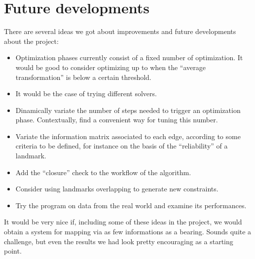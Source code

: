 \section{Future developments}
There are several ideas we got about improvements and future developments about the project:
\begin{itemize}
  \item Optimization phases currently consist of a fixed number of optimization. It would be good to consider optimizing up to when the ``average transformation'' is below a certain threshold.
  \item It would be the case of trying different solvers.
  \item Dinamically variate the number of steps needed to trigger an optimization phase. Contextually, find a convenient way for tuning this number.
  \item Variate the information matrix associated to each edge, according to some criteria to be defined, for instance on the basis of the ``reliability'' of a landmark.
  \item Add the ``closure'' check to the workflow of the algorithm.
  \item Consider using landmarks overlapping to generate new constraints.
  \item Try the program on data from the real world and examine its performances.
\end{itemize}

It would be very nice if, including some of these ideas in the project, we would obtain a system for mapping via as few informations as a bearing. Sounds quite a challenge, but even the results we had look pretty encouraging as a starting point.
